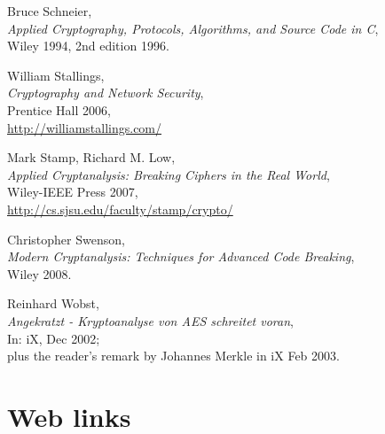 \begin{thebibliography}{99999}
  
       Bruce Schneier, \\
       {\em Applied Cryptography, Protocols, Algorithms, and Source Code in C}, \\
       Wiley 1994, 2nd edition 1996.

  
       William Stallings, \\
       {\em Cryptography and Network Security}, \\
       Prentice Hall 2006,\\
       \url{http://williamstallings.com/}

  
       Mark Stamp, Richard M. Low, \\
       {\em Applied Cryptanalysis: Breaking Ciphers in the Real World}, \\
       Wiley-IEEE Press 2007, \\
       \url{http://cs.sjsu.edu/faculty/stamp/crypto/}

  
       Christopher Swenson, \\
       {\em Modern Cryptanalysis: Techniques for Advanced Code Breaking}, \\
       Wiley 2008.

  
       Reinhard Wobst, \\
       {\em Angekratzt - Kryptoanalyse von AES schreitet voran}, \\
       In: iX, Dec 2002; \\
       plus the reader's remark by Johannes Merkle in iX Feb 2003.

\end{thebibliography}



\newpage
\section*{Web links}

